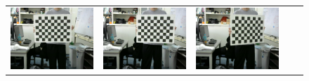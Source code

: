 \documentclass[]{jarticle}          %
\begin{document}
\begin{figure}[!ht]
  \begin{center}
    \begin{tabular}{ccccc}
      \includegraphics[keepaspectratio, scale=0.1]{figures/carib/camera2/1.png}&
      \includegraphics[keepaspectratio, scale=0.1]{figures/carib/camera2/2.png}&
      \includegraphics[keepaspectratio, scale=0.1]{figures/carib/camera2/3.png}&

\end{tabular}
\end{center}
\end{figure}
\end{document}
